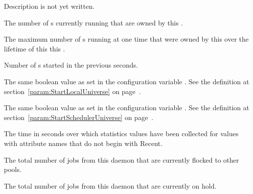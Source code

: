 \begin{description}
\item[\AdAttr{ServerTime}:] Description is not yet written.

\item[\AdAttr{ShadowsRunning}:] The number of s currently running 
  that are owned by this .

\item[\AdAttr{ShadowsRunningPeak}:] The maximum number of s running at one time
  that were owned by this  over the lifetime of this this .

\item[\AdAttr{ShadowsStarted}:] Number of s started
  in the previous  seconds.

\item[\AdAttr{StartLocalUniverse}:] The same boolean value as set in the
  configuration variable .
  See the definition at section~\ref{param:StartLocalUniverse} on
  page~\pageref{param:StartLocalUniverse}.

\item[\AdAttr{StartSchedulerUniverse}:] The same boolean value as set in the
  configuration variable .
  See the definition at section~\ref{param:StartSchedulerUniverse} on
  page~\pageref{param:StartSchedulerUniverse}.

\item[\AdAttr{StatsLifetime}:] The time in seconds over which statistics values have been collected
  for values with attribute names that do not begin with Recent.

\item[\AdAttr{TotalFlockedJobs}:] The total number of jobs from this
   daemon that are currently flocked to other pools.

\item[\AdAttr{TotalHeldJobs}:] The total number of jobs from this
   daemon that are currently on hold.


\end{description}
